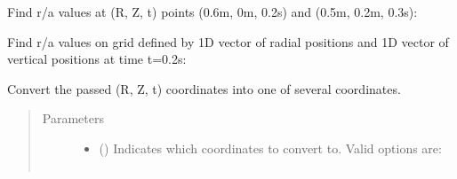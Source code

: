\documentclass[letterpaper,10pt,english]{sphinxmanual}
\begin{document}
\begin{fulllineitems}
\begin{fulllineitems}
Find r/a values at (R, Z, t) points (0.6m, 0m, 0.2s) and (0.5m, 0.2m, 0.3s):

\begin{sphinxVerbatim}[commandchars=\\\{\}]
  \PYG{p}{[} \PYG{p}{]} \PYG{p}{[} \PYG{p}{]} \PYG{p}{[} \PYG{p}{]} 
\end{sphinxVerbatim}

Find r/a values on grid defined by 1D vector of radial positions 
and 1D vector of vertical positions  at time t=0.2s:

\begin{sphinxVerbatim}[commandchars=\\\{\}]
     
\end{sphinxVerbatim}

\end{fulllineitems}


\begin{fulllineitems}
\label{\detokenize{eqtools:eqtools.core.Equilibrium.rz2rho}}
Convert the passed (R, Z, t) coordinates into one of several coordinates.
\begin{quote}\begin{description}
\item[{Parameters}] \leavevmode\begin{itemize}
\item {} 
 () \textendash{} 
Indicates which coordinates to convert to. Valid
options are:
\begin{quote}


\begin{savenotes}\sphinxattablestart
\centering
\begin{tabulary}{\linewidth}[t]{|T|T|}
\hline


\end{tabulary}
\end{savenotes}
\end{quote}
\end{itemize}
\end{description}
\end{quote}
\end{fulllineitems}
\end{fulllineitems}
\end{document}
